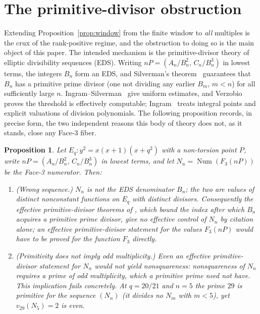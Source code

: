 \documentclass[11pt,reqno]{amsart}
\theoremstyle{plain}
\newtheorem{proposition}[theorem]{Proposition}
\theoremstyle{definition}
\DeclareMathOperator{\Num}{Num}
\begin{document}
\section{The primitive-divisor obstruction}\label{sec:mechanism}

Extending Proposition~\ref{prop:window} from the finite window to \emph{all}
multiples is the crux of the rank-positive regime, and the obstruction to doing
so is the main object of this paper. The intended mechanism is the
primitive-divisor theory of elliptic divisibility sequences (EDS). Writing
$nP=(A_n/B_n^2,\,C_n/B_n^3)$ in lowest terms, the integers $B_n$ form an EDS,
and Silverman's theorem~\cite{silverman-eds} guarantees that $B_n$
has a primitive prime divisor (one not dividing any earlier $B_m$, $m<n$) for
all sufficiently large $n$. Ingram--Silverman~\cite{ingram-silverman} give
uniform estimates, and Verzobio~\cite{verzobio} proves the threshold is
effectively computable; Ingram~\cite{ingram07} treats integral points and
explicit valuations of division polynomials. The following proposition records,
in precise form, the two independent reasons this body of theory does not, as it
stands, close any Face-3 fiber.

\begin{proposition}\label{prop:obstruction}
Let $E_q\colon y^2=x(x+1)(x+q^2)$ with a non-torsion point $P$, write
$nP=(A_n/B_n^2,\,C_n/B_n^3)$ in lowest terms, and let
$N_n=\Num(F_3(nP))$ be the Face-3 numerator. Then:
\begin{enumerate}
\item[(i)] \textup{(Wrong sequence.)} $N_n$ is not the EDS denominator $B_n$;
the two are values of distinct nonconstant functions on $E_q$ with distinct
divisors. Consequently the effective primitive-divisor theorems of
\cite{silverman-eds,ingram-silverman,verzobio}, which bound the index after which
$B_n$ acquires a primitive prime divisor, give no effective control of $N_n$ by
citation alone; an effective primitive-divisor statement for the values
$F_3(nP)$ would have to be proved for the function $F_3$ directly.
\item[(ii)] \textup{(Primitivity does not imply odd multiplicity.)} Even an
effective primitive-divisor statement for $N_n$ would not yield nonsquareness:
nonsquareness of $N_n$ requires a prime of \emph{odd} multiplicity, which a
primitive prime need not have. This implication fails concretely. At $q=20/21$
and $n=5$ the prime $29$ is primitive for the sequence $(N_n)$ \textup{(}it
divides no $N_m$ with $m<5$\textup{)}, yet $v_{29}(N_5)=2$ is even.
\end{enumerate}
\end{proposition}
\end{document}

